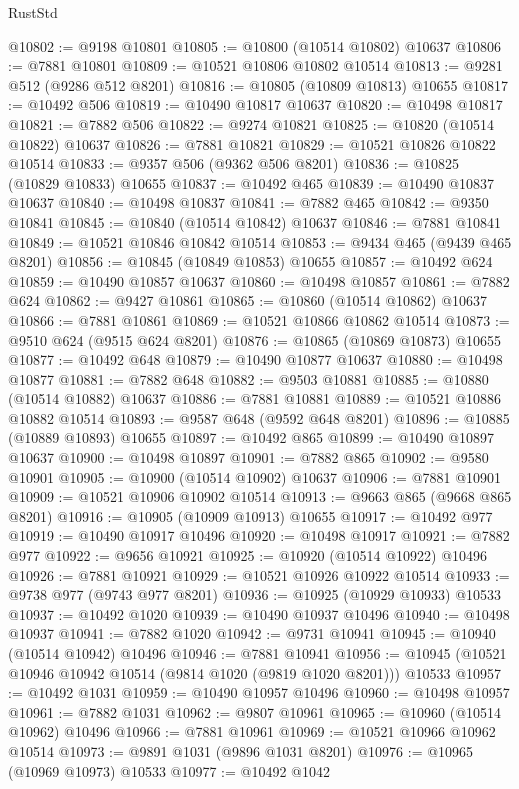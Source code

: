 \begin{lexlean}{RustStd}
\begin{coremodule}
@10802 := @9198 @10801
@10805 := @10800 (@10514 @10802) @10637
@10806 := @7881 @10801
@10809 := @10521 @10806 @10802 @10514
@10813 := @9281 @512 (@9286 @512 @8201)
@10816 := @10805 (@10809 @10813) @10655
@10817 := @10492 @506
@10819 := @10490 @10817 @10637
@10820 := @10498 @10817
@10821 := @7882 @506
@10822 := @9274 @10821
@10825 := @10820 (@10514 @10822) @10637
@10826 := @7881 @10821
@10829 := @10521 @10826 @10822 @10514
@10833 := @9357 @506 (@9362 @506 @8201)
@10836 := @10825 (@10829 @10833) @10655
@10837 := @10492 @465
@10839 := @10490 @10837 @10637
@10840 := @10498 @10837
@10841 := @7882 @465
@10842 := @9350 @10841
@10845 := @10840 (@10514 @10842) @10637
@10846 := @7881 @10841
@10849 := @10521 @10846 @10842 @10514
@10853 := @9434 @465 (@9439 @465 @8201)
@10856 := @10845 (@10849 @10853) @10655
@10857 := @10492 @624
@10859 := @10490 @10857 @10637
@10860 := @10498 @10857
@10861 := @7882 @624
@10862 := @9427 @10861
@10865 := @10860 (@10514 @10862) @10637
@10866 := @7881 @10861
@10869 := @10521 @10866 @10862 @10514
@10873 := @9510 @624 (@9515 @624 @8201)
@10876 := @10865 (@10869 @10873) @10655
@10877 := @10492 @648
@10879 := @10490 @10877 @10637
@10880 := @10498 @10877
@10881 := @7882 @648
@10882 := @9503 @10881
@10885 := @10880 (@10514 @10882) @10637
@10886 := @7881 @10881
@10889 := @10521 @10886 @10882 @10514
@10893 := @9587 @648 (@9592 @648 @8201)
@10896 := @10885 (@10889 @10893) @10655
@10897 := @10492 @865
@10899 := @10490 @10897 @10637
@10900 := @10498 @10897
@10901 := @7882 @865
@10902 := @9580 @10901
@10905 := @10900 (@10514 @10902) @10637
@10906 := @7881 @10901
@10909 := @10521 @10906 @10902 @10514
@10913 := @9663 @865 (@9668 @865 @8201)
@10916 := @10905 (@10909 @10913) @10655
@10917 := @10492 @977
@10919 := @10490 @10917 @10496
@10920 := @10498 @10917
@10921 := @7882 @977
@10922 := @9656 @10921
@10925 := @10920 (@10514 @10922) @10496
@10926 := @7881 @10921
@10929 := @10521 @10926 @10922 @10514
@10933 := @9738 @977 (@9743 @977 @8201)
@10936 := @10925 (@10929 @10933) @10533
@10937 := @10492 @1020
@10939 := @10490 @10937 @10496
@10940 := @10498 @10937
@10941 := @7882 @1020
@10942 := @9731 @10941
@10945 := @10940 (@10514 @10942) @10496
@10946 := @7881 @10941
@10956 := @10945 (@10521 @10946 @10942 @10514 (@9814 @1020 (@9819 @1020 @8201))) @10533
@10957 := @10492 @1031
@10959 := @10490 @10957 @10496
@10960 := @10498 @10957
@10961 := @7882 @1031
@10962 := @9807 @10961
@10965 := @10960 (@10514 @10962) @10496
@10966 := @7881 @10961
@10969 := @10521 @10966 @10962 @10514
@10973 := @9891 @1031 (@9896 @1031 @8201)
@10976 := @10965 (@10969 @10973) @10533
@10977 := @10492 @1042

\end{coremodule}
\end{lexlean}
